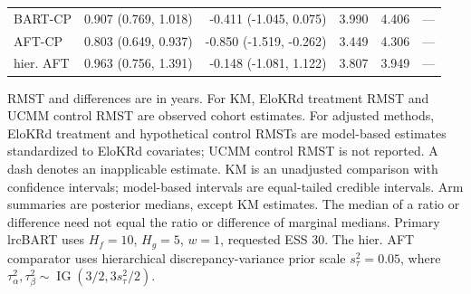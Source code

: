 \begin{landscape}
\begin{longtable}{lrrrrr}
BART-CP & 0.907 (0.769, 1.018) & -0.411 (-1.045, 0.075) & 3.990 & 4.406 & --- \\
AFT-CP & 0.803 (0.649, 0.937) & -0.850 (-1.519, -0.262) & 3.449 & 4.306 & --- \\
hier. AFT & 0.963 (0.756, 1.391) & -0.148 (-1.081, 1.122) & 3.807 & 3.949 & --- \\
\end{longtable}
\noindent\begin{minipage}{\linewidth}\footnotesize RMST and differences are in years. For KM, EloKRd treatment RMST and UCMM control RMST are observed cohort estimates. For adjusted methods, EloKRd treatment and hypothetical control RMSTs are model-based estimates standardized to EloKRd covariates; UCMM control RMST is not reported. A dash denotes an inapplicable estimate. KM is an unadjusted comparison with confidence intervals; model-based intervals are equal-tailed credible intervals. Arm summaries are posterior medians, except KM estimates. The median of a ratio or difference need not equal the ratio or difference of marginal medians. Primary lrcBART uses $H_f=10$, $H_g=5$, $w=1$, requested ESS 30. The hier. AFT comparator uses hierarchical discrepancy-variance prior scale $s_\tau^2=0.05$, where $\tau_\alpha^2,\tau_\beta^2\sim\operatorname{IG}(3/2,3s_\tau^2/2)$.\end{minipage}
\endgroup
\end{landscape}
